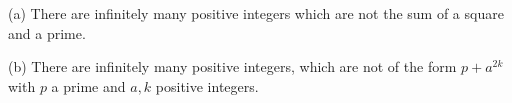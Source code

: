 (a) There are infinitely many positive integers which are not the sum of a square and a prime.

(b) There are infinitely many positive integers, which are not of the form $p + a^{2k}$ with $p$ a prime and $a, k$ positive integers.
